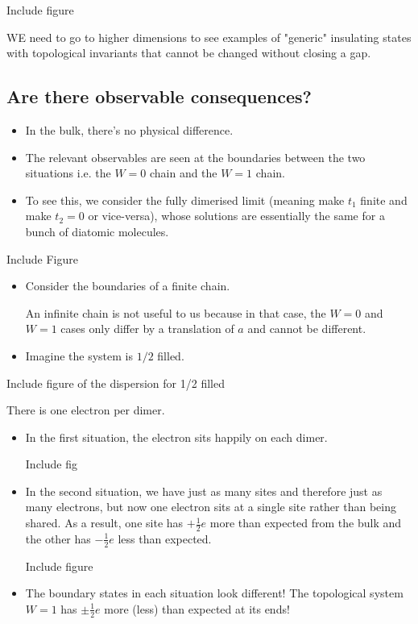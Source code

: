 \documentclass[11pt]{article}
\begin{document}
\begin{center}
  Include figure
\end{center} WE need to go to higher dimensions to see examples of "generic" insulating states with topological invariants that cannot be changed without closing a gap.

\vskip 1cm
\subsection{Are there observable consequences?}

\begin{itemize}
  \item In the bulk, there's no physical difference. 
  \item The relevant observables are seen at the boundaries between the two situations i.e. the $W = 0$ chain and the $W = 1$ chain.
  \item To see this, we consider the fully dimerised limit (meaning make $t_1$ finite and make $t_2 = 0$ or vice-versa), whose solutions are essentially the same for a bunch of diatomic molecules.
\end{itemize}

\begin{center}
  Include Figure
\end{center}

\begin{itemize}
  \item Consider the boundaries of a finite chain. \begin{thought}
    {An infinite chain is not useful to us because in that case, the $W = 0$ and $W = 1$ cases only differ by a translation of $a$ and cannot be different.}
  \end{thought}

  \item Imagine the system is $1/2$ filled. 
\end{itemize}

\begin{center}
  Include figure of the dispersion for 1/2 filled
\end{center} There is one electron per dimer.

\begin{itemize}
  \item  In the first situation, the electron sits happily on each dimer. \begin{center}
    Include fig
  \end{center}
  \item In the second situation, we have just as many sites and therefore just as many electrons, but now one electron sits at a single site rather than being shared. As a result, one site has $+\frac{1}{2}e$ more than expected from the bulk and the other has $-\frac{1}{2}e$ less than expected. \begin{center}
    Include figure
  \end{center}

  \item The boundary states in each situation look different! The topological system $W=1$ has $\pm \frac{1}{2} e$ more (less) than expected at its ends!
\end{itemize}
\end{document}
